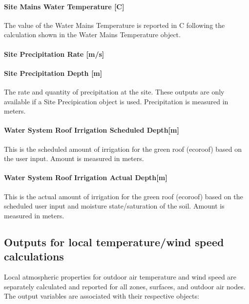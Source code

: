 \paragraph{Site Mains Water Temperature {[}C{]}}\label{site-mains-water-temperature-c}

The value of the Water Mains Temperature is reported in C following the calculation shown in the Water Mains Temperature object.

\paragraph{Site Precipitation Rate {[}m/s{]}}\label{site-precipitation-rate-ms}

\paragraph{Site Precipitation Depth {[}m{]}}\label{site-precipitation-depth-m-1}

The rate and quantity of precipitation at the site. These outputs are only available if a Site Precipication object is used. Precipitation is measured in meters.

\paragraph{Water System Roof Irrigation Scheduled Depth{[}m{]}}\label{water-system-roof-irrigation-scheduled-depthm}

This is the scheduled amount of irrigation for the green roof (ecoroof) based on the user input. Amount is measured in meters.

\paragraph{Water System Roof Irrigation Actual Depth{[}m{]}}\label{water-system-roof-irrigation-actual-depthm}

This is the actual amount of irrigation for the green roof (ecoroof) based on the scheduled user input and moisture state/saturation of the soil. Amount is measured in meters.

\subsection{Outputs for local temperature/wind speed calculations}\label{outputs-for-local-temperaturewind-speed-calculations}

Local atmospheric properties for outdoor air temperature and wind speed are separately calculated and reported for all zones, surfaces, and outdoor air nodes. The output variables are associated with their respective objects:

